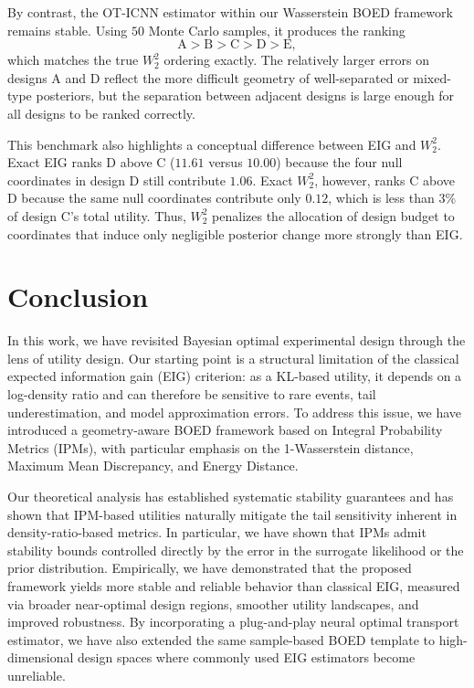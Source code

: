 \documentclass[twoside,11pt]{article}
\begin{document}
By contrast, the OT-ICNN estimator within our Wasserstein BOED framework remains stable. Using $50$ Monte Carlo samples, it produces the ranking
\[
\text{A}>\text{B}>\text{C}>\text{D}>\text{E},
\]
which matches the true $W_2^2$ ordering exactly. The relatively larger errors on designs A and D reflect the more difficult geometry of well-separated or mixed-type posteriors, but the separation between adjacent designs is large enough for all designs to be ranked correctly.

This benchmark also highlights a conceptual difference between EIG and $W_2^2$. Exact EIG ranks D above C ($11.61$ versus $10.00$) because the four null coordinates in design D still contribute $1.06$. Exact $W_2^2$, however, ranks C above D because the same null coordinates contribute only $0.12$, which is less than $3\%$ of design C's total utility. Thus, $W_2^2$ penalizes the allocation of design budget to coordinates that induce only negligible posterior change more strongly than EIG.

\section{Conclusion}
\label{sec:conclusion}
In this work, we have revisited Bayesian optimal experimental design through the lens of utility design. Our starting point is a structural limitation of the classical expected information gain (EIG) criterion: as a KL-based utility, it depends on a log-density ratio and can therefore be sensitive to rare events, tail underestimation, and model approximation errors. To address this issue, we have introduced a geometry-aware BOED framework based on Integral Probability Metrics (IPMs), with particular emphasis on the 1-Wasserstein distance, Maximum Mean Discrepancy, and Energy Distance.

Our theoretical analysis has established systematic stability guarantees and has shown that IPM-based utilities naturally mitigate the tail sensitivity inherent in density-ratio-based metrics. In particular, we have shown that IPMs admit stability bounds controlled directly by the error in the surrogate likelihood or the prior distribution. Empirically, we have demonstrated that the proposed framework yields more stable and reliable behavior than classical EIG, measured via broader near-optimal design regions, smoother utility landscapes, and improved robustness. By incorporating a plug-and-play neural optimal transport estimator, we have also extended the same sample-based BOED template to high-dimensional design spaces where commonly used EIG estimators become unreliable.
\end{document}
